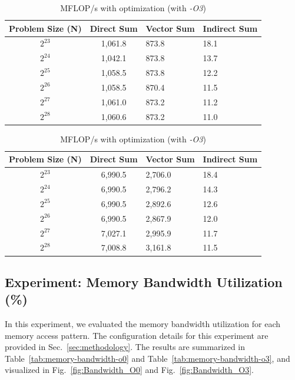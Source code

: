 \begin{table}[htbp]
    \centering\small
    \begin{tabular}{c|cll}
 Problem Size (N) & Direct Sum & Vector Sum & Indirect Sum \\ \hline
 $2^{23}$ & 1,061.8& 873.8&18.1\\
 $2^{24}$ & 1,042.1& 873.8&13.7\\
 $2^{25}$ & 1,058.5& 873.8&12.2\\
 $2^{26}$ & 1,058.5& 870.4&11.5\\
 $2^{27}$ & 1,061.0& 873.2&11.2\\
 $2^{28}$ & 1,060.6& 873.2&11.0\\ 
    \end{tabular}
    \caption{MFLOP/s without optimization (with \textit{-O0})}
    \label{tab:mflops-o0}
    \begin{tabular}{c|cll}
 Problem Size (N) & Direct Sum & Vector Sum & Indirect Sum \\ \hline
 $2^{23}$ & 6,990.5& 2,706.0&18.4\\
 $2^{24}$ & 6,990.5& 2,796.2&14.3\\
 $2^{25}$ & 6,990.5& 2,892.6&12.6\\
 $2^{26}$ & 6,990.5& 2,867.9&12.0\\
 $2^{27}$ & 7,027.1& 2,995.9&11.7\\
 $2^{28}$ & 7,008.8& 3,161.8&11.5\\ 
    \end{tabular}
    \caption{MFLOP/s with optimization (with \textit{-O3})}
    \label{tab:mflops-o3}
\end{table}

\subsection{Experiment: Memory Bandwidth Utilization (\%)}
In this experiment, we evaluated the memory bandwidth utilization for each memory access pattern. The configuration details for this experiment are provided in Sec.~\ref{sec:methodology}. The results are summarized in Table~\ref{tab:memory-bandwidth-o0} and Table~\ref{tab:memory-bandwidth-o3}, and visualized in Fig.~\ref{fig:Bandwidth_O0} and Fig.~\ref{fig:Bandwidth_O3}.

